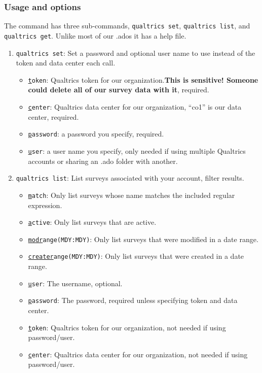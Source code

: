 \documentclass[11pt]{article}
\begin{document}
{\subsubsection{Usage and options}
The command has three sub-commands, \texttt{qualtrics set}, \texttt{qualtrics list}, and \texttt{qualtrics get}. Unlike most of our .ados it has a help file.
\begin{enumerate}
\item \texttt{qualtrics set}: Set a password and optional user name to use instead of the token and data center each call.
\begin{itemize}
\item \texttt{\underline{t}oken}: Qualtrics token for our organization.\textbf{This is sensitive! Someone could delete all of our survey data with it}, required.
\item \texttt{\underline{c}enter}: Qualtrics data center for our organization, ``co1'' is our data center, required.
\item \texttt{\underline{p}assword}: a password you specify, required.
\item \texttt{\underline{u}ser}: a user name you specify, only needed if using multiple Qualtrics accounts or sharing an .ado folder with another.
\end{itemize}
\item \texttt{qualtrics list}: List surveys associated with your account, filter results.
\begin{itemize}
\item \texttt{\underline{m}atch}: Only list surveys whose name matches the included regular expression.
\item \texttt{\underline{a}ctive}: Only list surveys that are active.
\item \texttt{\underline{modr}ange(MDY:MDY)}: Only list surveys that were modified in a date range.
\item \texttt{\underline{creater}ange(MDY:MDY)}: Only list surveys that were created in a date range.
\item \texttt{\underline{u}ser}: The username, optional.
\item \texttt{\underline{p}assword}: The password, required unless specifying token and data center.
\item \texttt{\underline{t}oken}: Qualtrics token for our organization, not needed if using password/user.
\item \texttt{\underline{c}enter}: Qualtrics data center for our organization, not needed if using password/user.

\end{itemize}
\end{enumerate}}
\end{document}
